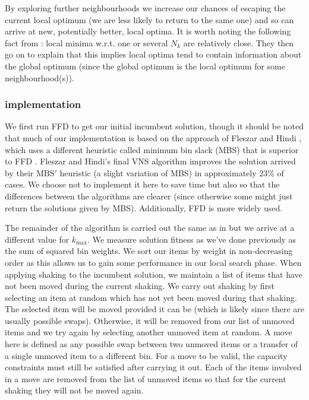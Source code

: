 \documentclass[12pt]{article}
\begin{document}
By exploring further neighbourhoods we increase our chances of escaping the current local optimum (we are less likely to return to the same one) and so can arrive at new, potentially better, local optima. It is worth noting the following fact from \cite{gendreau}: local minima w.r.t. one or several $N_{k}$ are relatively close. They then go on to explain that this implies local optima tend to contain information about the global optimum (since the global optimum is the local optimum for some neighbourhood(s)).  

\subsubsection{implementation}
We first run FFD to get our initial incumbent solution, though it should be noted that much of our implementation is based on the approach of Fleszar and Hindi \cite{fleszar}, which uses a different heuristic called minimum bin slack (MBS) that is superior to FFD \cite{gupta}. Fleszar and Hindi’s final VNS algorithm improves the solution arrived by their $\mathrm{MBS}'$ heuristic (a slight variation of MBS) in approximately 23\% of cases. We choose not to implement it here to save time but also so that the differences between the algorithms are clearer (since otherwise some might just return the solutions given by MBS). Additionally, FFD is more widely used.  

The remainder of the algorithm is carried out the same as in \cite{fleszar} but we arrive at a different value for $k_{\max}$. We measure solution fitness as we’ve done previously as the sum of squared bin weights. We sort our items by weight in non-decreasing order as this allows us to gain some performance in our local search phase. When applying shaking to the incumbent solution, we maintain a list of items that have not been moved during the current shaking.  We carry out shaking by first selecting an item at random which has not yet been moved during that shaking. The selected item will be moved provided it can be (which is likely since there are usually possible swaps). Otherwise, it will be removed from our list of unmoved items and we try again by selecting another unmoved item at random. A move here is defined as any possible swap between two unmoved items or a transfer of a single unmoved item to a different bin. For a move to be valid, the capacity constraints must still be satisfied after carrying it out. Each of the items involved in a move are removed from the list of unmoved items so that for the current shaking they will not be moved again.  
\end{document}
